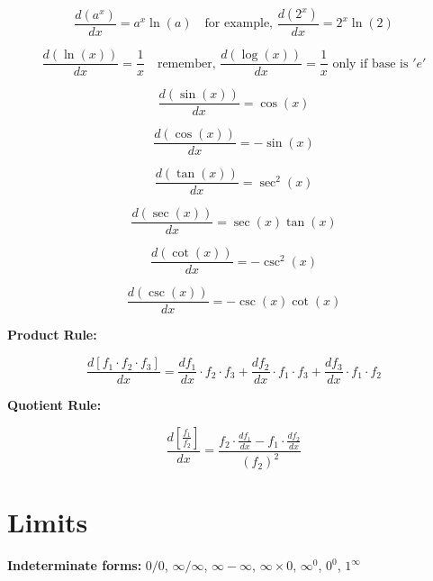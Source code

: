 \documentclass{article}
\begin{document}
\begin{equation}
\frac{d(a^x)}{dx} = a^x \ln(a) \quad \text{for example, } \frac{d(2^x)}{dx} = 2^x \ln(2)
\end{equation}

\begin{equation}
\frac{d(\ln(x))}{dx} = \frac{1}{x} \quad \text{remember, } \frac{d(\log(x))}{dx} = \frac{1}{x} \text{ only if base is } 'e'
\end{equation}

\begin{equation}
\frac{d(\sin(x))}{dx} = \cos(x)
\end{equation}

\begin{equation}
\frac{d(\cos(x))}{dx} = -\sin(x)
\end{equation}

\begin{equation}
\frac{d(\tan(x))}{dx} = \sec^2(x)
\end{equation}

\begin{equation}
\frac{d(\sec(x))}{dx} = \sec(x)\tan(x)
\end{equation}

\begin{equation}
\frac{d(\cot(x))}{dx} = -\csc^2(x)
\end{equation}

\begin{equation}
\frac{d(\csc(x))}{dx} = -\csc(x)\cot(x)
\end{equation}

\textbf{Product Rule:}

\begin{equation}
\frac{d[f_1 \cdot f_2 \cdot f_3]}{dx} = \frac{df_1}{dx} \cdot f_2 \cdot f_3 + \frac{df_2}{dx} \cdot f_1 \cdot f_3 + \frac{df_3}{dx} \cdot f_1 \cdot f_2
\end{equation}

\textbf{Quotient Rule:}

\begin{equation}
\frac{d\left[\frac{f_1}{f_2}\right]}{dx} = \frac{f_2 \cdot \frac{df_1}{dx} - f_1 \cdot \frac{df_2}{dx}}{(f_2)^2}
\end{equation}

\section{Limits}

\textbf{Indeterminate forms:} $0/0$, $\infty/\infty$, $\infty - \infty$, $\infty \times 0$, $\infty^0$, $0^0$, $1^\infty$
\end{document}
